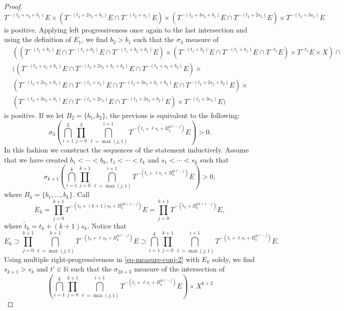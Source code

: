 \documentclass[letter, 11pt]{article}
\theoremstyle{definition}
\theoremstyle{plain}
\newcommand{\N}{\mathbb{N}}
\newcommand{\1}{\mathbbm{1}}
\begin{document}
\begin{proof}
    $$ T^{-(t_2+s_2+b_1)}E \times (T^{-(t_2+2s_2+b_1)} E\cap T^{-(t_2+s_2)}E) \times  (T^{-(t_2+3s_2+b_1)} E\cap T^{-(t_2+2s_2)}E) \times T^{-(t_2+3s_2)}E$$
    is positive. Applying left progressiveness once again to the last intersection and using the definition of $E_1$, we find $b_2>b_1$ such that the $\sigma_3$ measure of     
    \begin{align*}
    &  \left( (T^{-(t_1
    +b_1)}E \cap T^{-(t_1
    +b_2)}E \cap T^{-(t_1
    +b_2+b_1)}E) \times (T^{-(t_1
    +b_2)}E \cap  T^{-(t_1+b_1)}E \cap T^{-t_1 }E) \times T^{-t_1 }E \times X \right)  \cap \\
   &\Big( (T^{-(t_2+s_2+b_1)}E \cap T^{-(t_2+2s_2+b_1+b_2)} E\cap  T^{-(t_2+s_2+b_2)}E)  \times  \\ &   (T^{-(t_2+2s_2+b_1)} E\cap T^{-(t_2+s_2)}E \cap T^{-(t_2+3s_2+b_1+b_2)} E\cap T^{-(t_2+2s_2+b_2)} E )\times \\
   & (T^{-(t_2+3s_2+b_1)} E\cap T^{-(t_2+2s_2)}E \cap T^{-(t_2+3s_2+b_2)}E) \times T^{-(t_2+3s_2)}E \Big) 
    \end{align*}
is positive. If we let $B_2=\{b_1,b_2\}$, the previous is equivalent to the following:
     $$\sigma_{3}\left(\bigcap_{i=1}^2  \prod_{j=0}^{3}  \bigcap_{\ell=\max(j,1)}^{i+1}  T^{-\left( t_i+\ell s_i+ B_2^{\oplus \ell-j} \right)}  E   \right)>0. $$
In this fashion we   construct the sequences of the statement inductively. Assume that we have created $b_1<\cdots<b_k$, $t_1<\cdots<t_k$ and 
    $ s_1<\cdots<s_k$ such that 
    \begin{equation}\label{eq-measure-conj-2}
\sigma_{k+1}\left(\bigcap_{i=1}^k  \prod_{j=0}^{k+1}  \bigcap_{\ell=\max(j,1)}^{i+1}  T^{-\left( t_i+\ell s_i+ B_k^{\oplus \ell-j} \right)}  E   \right)>0,
    \end{equation}
    where $B_k=\{b_1,\ldots,b_k\}$.
Call $$E_k=   \prod_{j=0}^{k+1}    T^{-\left( t_k+(k+1) s_k+ B_k^{\oplus k+1-j} \right)}  E =\prod_{j=0}^{k+1}    T^{-\left( \tilde{t}_k+ B_k^{\oplus k+1-j} \right)}  E ,  $$ 
where $\tilde{t}_k=t_k+(k+1) s_k $. Notice that
$$ E_k\supset   \prod_{j=0}^{k+1}  \bigcap_{\ell=\max(j,1)}^{k+1}  T^{-\left( t_k+\ell s_k+ B_k^{\oplus \ell-j} \right)}  E  \supset  \bigcap_{i=1}^k  \prod_{j=0}^{k+1}  \bigcap_{\ell=\max(j,1)}^{i+1}  T^{-\left( t_i+\ell s_i+ B_k^{\oplus \ell-j} \right)}  E .$$
Using multiple right-progressiveness in \eqref{eq-measure-conj-2} with $E_k$ 
solely, we find $s_{k+1}>s_k$ and $t'\in \N$ such that the $\sigma_{2k+3}$ measure of the intersection of
$$\left(\bigcap_{i=1}^k  \prod_{j=0}^{k+1}  \bigcap_{\ell=\max(j,1)}^{i+1}  T^{-\left( t_i+\ell s_i+ B_k^{\oplus \ell-j} \right)}  E \right) \times X^{k+2}$$

\end{proof}
\end{document}
